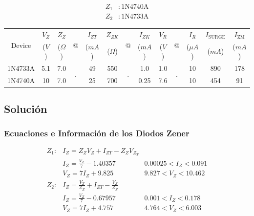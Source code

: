 \documentclass[12pt]{article}
\begin{document}
\begin{align*}
  Z_1 &: \mathrm{1N4740A} \\
  Z_2 &: \mathrm{1N4733A}
\end{align*}

\begin{center}
    \begin{tabular}{ | c | c c c c | c c c | c c c | c | c | }
      \hline
      \multirow{2}{*}{Device} &
      $V_Z$ & $Z_Z$ & \multirow{2}{*}{@} & $I_{ZT}$ &
      $Z_{ZK}$ & \multirow{2}{*}{@} & $I_{ZK}$ &
      $V_R$ & \multirow{2}{*}{@} & $I_R$ &
      $I_{\mathrm{SURGE}}$ &
      $I_{\mathrm{ZM}}$
      \\
      &
      ($V$) & ($\Omega$) & & ($mA$) &
      ($\Omega$) & & ($mA$) &
      ($V$) & & ($\mu A$) &
      ($mA$) &
      ($mA$)
      \\
      \hline
      1N4733A &
      5.1 & 7.0 & \multirow{2}{*}{.} & 49 &
      550 & \multirow{2}{*}{.} & 1.0 &
      1.0 & \multirow{2}{*}{.} & 10 &
      890 &
      178
      \\
      1N4740A &
      10 & 7.0 & & 25 &
      700 & & 0.25 &
      7.6 & & 10 &
      454 &
      91
      \\
      \hline
    \end{tabular}
\end{center}

\subsection{Solución}

\subsubsection{Ecuaciones e Información de los Diodos Zener}

\begin{align*}
  Z_1 :& I_Z = Z_Z V_Z + I_{ZT} - Z_Z V_{Z_T}\\
      & I_Z = \frac{V_Z}{7} - 1.40357 & 0.00025 < I_Z < 0.091\\
      & V_Z = 7 I_Z + 9.825 & 9.827 < V_Z < 10.462\\
  Z_2 :& I_Z = \frac{V_Z}{Z_Z} + I_{ZT} - \frac{V_Z}{Z_Z} \\
       & I_Z = \frac{V_Z}{7} - 0.67957 & 0.001 < I_Z < 0.178 \\
       & V_Z = 7 I_Z + 4.757 & 4.764 < V_Z < 6.003\\
\end{align*}
\end{document}
